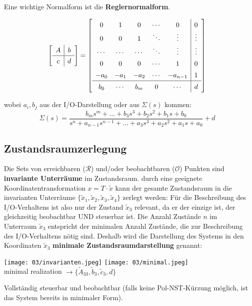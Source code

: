             Eine wichtige Normalform ist die \textbf{Reglernormalform}.
            \begin{center}
               \[\left[{\renewcommand{\arraystretch}{1.3}\begin{array}{c|c}
              A & b\\
            \hline
            c & d
            \end{array}}
               \right]= \left[{\renewcommand{\arraystretch}{1.4}\begin{array}{ccccc|c}
               0 & 1 & 0 & \cdots & 0 & 0 \\
               0 & 0 & 1 &\ddots & \vdots & \vdots\\
            \cdots & \cdots & \cdots & \ddots & \vdots & \vdots \\
            0 & 0 & 0 & \cdots & 1 & 0\\
            -a_0 & -a_1 & -a_2 & \cdots & -a_{n-1} & 1 \\
            \hline
            b_0 & \cdots & b_m & 0 & \cdots & d
               \end{array}}
             \right]
               \] 
            \end{center}
            wobei $a_i,b_j$ aus der I/O-Darstellung oder aus $\Sigma(s)$ kommen:
            \[\Sigma(s) =\frac{b_ms^m+\dots+b_3s^3+b_2s^2+b_1s+b_0}{s^n+a_{n-1}s^{n-1}+\dots+a_3s^3+a_2s^2+a_1s+a_0}+d\]
        \subsection{Zustandsraumzerlegung}
            Die Sets von erreichbaren ($\mathcal{R}$) und/oder beobachtbaren ($\mathcal{O}$) Punkten sind \textbf{invariante Unterräume} im Zustandsraum. durch eine geeignete Koordinatentransformation $x = T\cdot\tilde{x}$ kann der gesamte Zustandsraum in die invarianten Unterräume $\{\tilde{x}_1,\tilde{x}_2,\tilde{x}_3,\tilde{x}_4\}$ zerlegt werden:
            Für die Beschreibung des I/O-Verhaltens ist also nur der Zustand $\tilde{x}_3$ relevant, da er der einzige ist, der gleichzeitig beobachtbar UND steuerbar ist. Die Anzahl Zustände $n$ im Unterraum $\tilde{x}_3$ entspricht der minimalen Anzahl Zustände, die zur Beschreibung des I/O-Verhaltens nötig sind. Deshalb wird die Darstellung des Systems in den Koordinaten $\tilde{x}_3$ \textbf{minimale Zustandsraumdarstellung} genannt:
            \begin{center}
                \texttt{[image: 03/invarianten.jpeg]}
                \texttt{[image: 03/minimal.jpeg]}
                \\minimal realization $\rightarrow\{\tilde{A}_{33},\tilde{b}_3,\tilde{c}_3,d\}$ 
            \end{center}
            Vollständig steuerbar und beobachtbar (falls keine Pol-NST-Kürzung möglich, ist das System bereits in minimaler Form).
            
